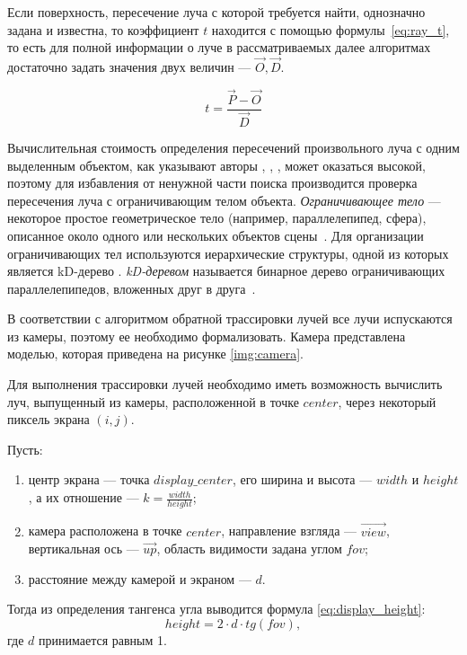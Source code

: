 Если поверхность, пересечение луча с которой требуется найти, однозначно задана и известна, то коэффициент $t$ находится с помощью формулы~\ref{eq:ray_t}, то есть для полной информации о луче в рассматриваемых далее алгоритмах достаточно задать значения двух величин --- $\overrightarrow{O}, \overrightarrow{D}$.

\begin{equation}\label{eq:ray_t}
	t = \frac{\overrightarrow{P} - \overrightarrow{O}}{\overrightarrow{D}}
\end{equation}

Вычислительная стоимость определения пересечений произвольного луча с одним выделенным объектом, как указывают авторы \cite{божко2007компьютерная}, \cite{роджерс}, \cite{боресков}, может оказаться высокой, поэтому для избавления от ненужной части поиска производится проверка пересечения луча с ограничивающим телом объекта.
\textit{Ограничивающее тело} --- некоторое простое геометрическое тело (например, параллелепипед, сфера), описанное около одного или нескольких объектов сцены~\cite{боресков}.
Для организации ограничивающих тел используются иерархические структуры, одной из которых является kD-дерево \cite{боресков}.
\textit{kD-деревом} называется бинарное дерево ограничивающих параллелепипедов, вложенных друг в друга~\cite{боресков}.

В соответствии с алгоритмом обратной трассировки лучей все лучи испускаются из камеры, поэтому ее необходимо формализовать.
Камера представлена моделью, которая приведена на рисунке \ref{img:camera}.


Для выполнения трассировки лучей необходимо иметь возможность вычислить луч, выпущенный из камеры, расположенной в точке $center$, через некоторый пиксель экрана $(i, j)$.

Пусть:
\begin{enumerate}
	\item центр экрана --- точка $display\_center$, его ширина и высота --- $width$ и $height$, а их отношение --- $k = \frac{width}{height}$;
	\item камера расположена в точке $center$, направление взгляда --- $\overrightarrow{view}$, вертикальная ось --- $\overrightarrow{up}$, область видимости задана углом $fov$;
	\item расстояние между камерой и экраном --- $d$.
\end{enumerate}

Тогда из определения тангенса угла выводится формула \ref{eq:display_height}:
\begin{equation}\label{eq:display_height}
	height = 2 \cdot d \cdot tg(fov),
\end{equation}
где $d$ принимается равным 1.

